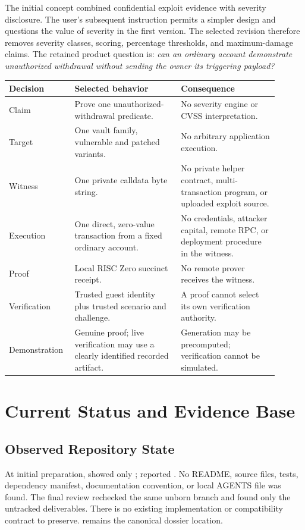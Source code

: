 \documentclass[11pt]{article}
\newcommand{\filepath}[1]{\path{#1}}
\begin{document}
The initial concept combined confidential exploit evidence with severity disclosure. The user's subsequent instruction permits a simpler design and questions the value of severity in the first version. The selected revision therefore removes severity classes, scoring, percentage thresholds, and maximum-damage claims. The retained product question is: \emph{can an ordinary account demonstrate unauthorized withdrawal without sending the owner its triggering payload?}

\begin{longtable}{L{0.19\linewidth}L{0.37\linewidth}L{0.34\linewidth}}
\toprule
\textbf{Decision} & \textbf{Selected behavior} & \textbf{Consequence} \\
\midrule
\endhead
Claim & Prove one unauthorized-withdrawal predicate. & No severity engine or CVSS interpretation. \\
Target & One vault family, vulnerable and patched variants. & No arbitrary application execution. \\
Witness & One private calldata byte string. & No private helper contract, multi-transaction program, or uploaded exploit source. \\
Execution & One direct, zero-value transaction from a fixed ordinary account. & No credentials, attacker capital, remote RPC, or deployment procedure in the witness. \\
Proof & Local RISC Zero succinct receipt. & No remote prover receives the witness. \\
Verification & Trusted guest identity plus trusted scenario and challenge. & A proof cannot select its own verification authority. \\
Demonstration & Genuine proof; live verification may use a clearly identified recorded artifact. & Generation may be precomputed; verification cannot be simulated. \\
\bottomrule
\end{longtable}

\section{Current Status and Evidence Base}
\subsection{Observed Repository State}
At initial preparation,  showed only ;  reported . No README, source files, tests, dependency manifest, documentation convention, or local AGENTS file was found. The final review rechecked the same unborn branch and found only the untracked \filepath{docs/} deliverables. There is no existing implementation or compatibility contract to preserve. \filepath{docs/} remains the canonical dossier location.
\end{document}
